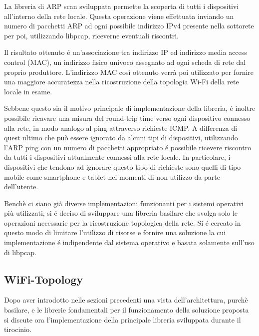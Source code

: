 La libreria di ARP scan sviluppata permette la scoperta di tutti i dispositivi all'interno della rete locale.
Questa operazione viene effettuata inviando un numero di pacchetti ARP ad ogni possibile indirizzo IPv4 presente nella sottorete per poi, utilizzando libpcap, riceverne eventuali riscontri.

Il risultato ottenuto \'e un'associazione tra indirizzo IP ed indirizzo media access control (MAC), un indirizzo fisico univoco assegnato ad ogni scheda di rete dal proprio produttore.
L'indirizzo MAC cos\`i ottenuto verr\`a poi utilizzato per fornire una maggiore accuratezza nella ricostruzione della topologia Wi-Fi della rete locale in esame.

Sebbene questo sia il motivo principale di implementazione della libreria, \'e inoltre possibile ricavare una misura del round-trip time verso ogni dispositivo connesso alla rete, in modo analogo al ping attraverso richieste ICMP.
A differenza di quest ultimo che pu\`o essere ignorato da alcuni tipi di dispositivi, utilizzando l'ARP ping con un numero di pacchetti appropriato \'e possibile ricevere riscontro da tutti i dispositivi attualmente connessi alla rete locale.
In particolare, i dispositivi che tendono ad ignorare questo tipo di richieste sono quelli di tipo mobile come smartphone e tablet nei momenti di non utilizzo da parte dell'utente.

Bench\`e ci siano gi\`a diverse implementazioni funzionanti per i sistemi operativi pi\`u utilizzati, si \'e deciso di sviluppare una libreria basilare che svolga solo le operazioni necessarie per la ricostruzione topologica della rete.
Si \'e cercato  in questo modo di limitare l'utilizzo di risorse e fornire una soluzione la cui implementazione \'e indipendente dal sistema operativo e basata solamente sull'uso di libpcap.

\newpage



\subsection{WiFi-Topology}
Dopo aver introdotto nelle sezioni precedenti una vista dell'architettura, purch\`e basilare, e le librerie fondamentali per il funzionamento della soluzione proposta si discute ora l'implementazione della principale libreria sviluppata durante il tirocinio.


